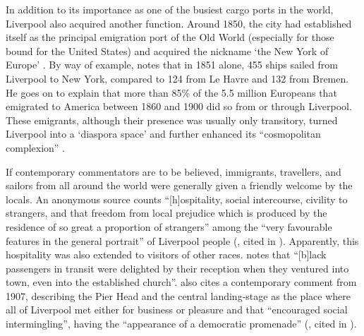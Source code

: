 In addition to its importance as one of the busiest cargo ports in the world, Liverpool also acquired another function.
Around 1850, the city had established itself as the principal emigration port of the Old World (especially for those bound for the United States) and acquired the nickname `the New York of Europe' \parencite[xxvii]{belchem2006c}.
By way of example, \citet[14]{belchem2006a} notes that in 1851 alone, 455 ships sailed from Liverpool to New York, compared to 124 from Le Havre and 132 from Bremen.
He goes on to explain that more than 85\% of the 5.5 million Europeans that emigrated to America between 1860 and 1900 did so from or through Liverpool.
These emigrants, although their presence was usually only transitory, turned Liverpool into a `diaspora space' and further enhanced its ``cosmopolitan complexion'' \parencite[14]{belchem2006a}.

If contemporary commentators are to be believed, immigrants, travellers, and sailors from all around the world were generally given a friendly welcome by the locals.
An anonymous source counts ``[h]ospitality, social intercourse, civility to strangers, and that freedom from local prejudice which is produced by the residence of so great a proportion of strangers'' among the ``very favourable features in the general portrait'' of Liverpool people (\citealt{anon1812}, cited in \citealt[12]{crowley2012}).
Apparently, this hospitality was also extended to visitors of other races.
\citet[13]{belchem2006a} notes that ``[b]lack passengers in transit were delighted by their reception when they ventured into town, even into the established church''.
\textcite{belchem2006d} also cites a contemporary comment from 1907, describing the Pier Head and the central landing-stage as the place where all of Liverpool met either for business or pleasure and that ``encouraged social intermingling'', having the ``appearance of a democratic promenade'' (\citealt{scott1907}, cited in \citealt[45]{belchem2006d}).

